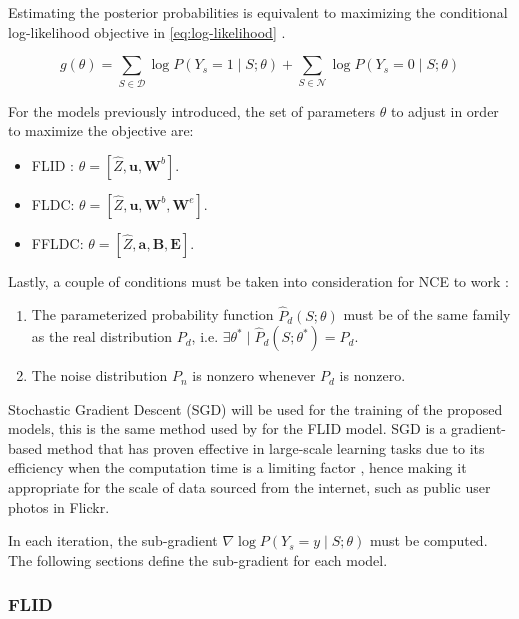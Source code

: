 Estimating the posterior probabilities is equivalent to maximizing the conditional log-likelihood objective in \ref{eq:log-likelihood} \citep{Gutmann12NCE}.

\begin{equation}
  \label{eq:log-likelihood}
  g(\theta) = \sum_{S \in \mathcal{D}}{\log{P(Y_{s} = 1 \mid S;\theta)}} + \sum_{S \in \mathcal{N}}{\log{P(Y_{s} = 0 \mid S;\theta)}}
\end{equation}

For the models previously introduced, the set of parameters $\theta$ to adjust in order to maximize the objective are:

\begin{itemize}
  \item FLID \citep{tschiatschek16learning}: $\theta = [\hat{Z}, \mathbf{u}, \mathbf{W}^{b}]$.
  \item FLDC: $\theta = [\hat{Z}, \mathbf{u}, \mathbf{W}^{b}, \mathbf{W}^{e}]$.
  \item FFLDC: $\theta = [\hat{Z}, \mathbf{a}, \mathbf{B}, \mathbf{E}]$.
\end{itemize}

Lastly, a couple of conditions must be taken into consideration for NCE to work \citep{Gutmann12NCE}:

\begin{enumerate}
  \item The parameterized probability function $\hat{P}_{d}(S;\theta)$ must be of the same family as the real distribution $P_{d}$, i.e. $\exists \theta^{*} \mid \hat{P}_{d}(S;\theta^{*}) = P_{d}$.
  \item The noise distribution $P_{n}$ is nonzero whenever $P_{d}$ is nonzero.
\end{enumerate}

Stochastic Gradient Descent (SGD) will be used for the training of the proposed models, this is the same method used by \citet{tschiatschek16learning} for the FLID model. SGD is a gradient-based method that has proven effective in large-scale learning tasks due to its efficiency when the computation time is a limiting factor \citep{Bottou2010, Zhang2004}, hence making it appropriate for the scale of data sourced from the internet, such as public user photos in Flickr.

In each iteration, the sub-gradient $\nabla \log{P(Y_{s} = y \mid S;\theta)}$ must be computed. The following sections define the sub-gradient for each model.

\subsubsection{FLID}

